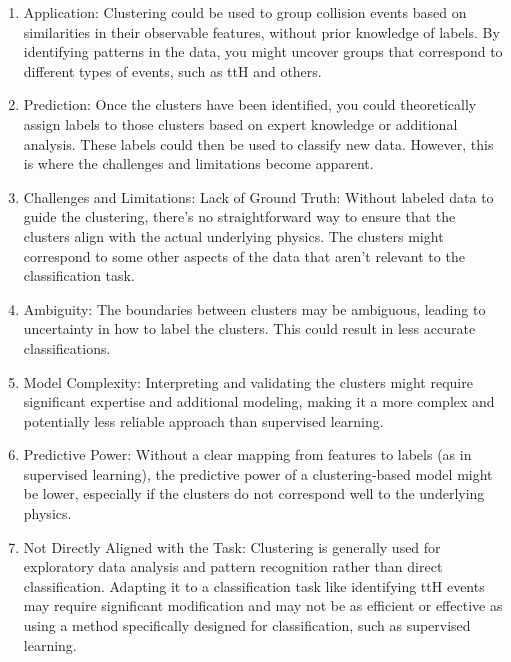 \begin{enumerate}
    \item Application: Clustering could be used to group collision events based on similarities in their observable
          features, without prior knowledge of labels. By identifying patterns in the data, you might uncover groups
          that correspond to different types of events, such as ttH and others.

    \item Prediction: Once the clusters have been identified, you could theoretically assign labels to those clusters
          based on expert knowledge or additional analysis. These labels could then be used to classify new data.
          However, this is where the challenges and limitations become apparent.

    \item Challenges and Limitations: Lack of Ground Truth: Without labeled data to guide the clustering, there's no
          straightforward way to ensure that the clusters align with the actual underlying physics. The clusters might
          correspond to some other aspects of the data that aren't relevant to the classification task.

    \item Ambiguity: The boundaries between clusters may be ambiguous, leading to uncertainty in how to label the
          clusters. This could result in less accurate classifications.

    \item Model Complexity: Interpreting and validating the clusters might require significant expertise and additional
          modeling, making it a more complex and potentially less reliable approach than supervised learning.

    \item Predictive Power: Without a clear mapping from features to labels (as in supervised learning), the predictive
          power of a clustering-based model might be lower, especially if the clusters do not correspond well to the
          underlying physics.

    \item Not Directly Aligned with the Task: Clustering is generally used for exploratory data analysis and pattern
          recognition rather than direct classification. Adapting it to a classification task like identifying ttH
          events may require significant modification and may not be as efficient or effective as using a method
          specifically designed for classification, such as supervised learning.
\end{enumerate}
